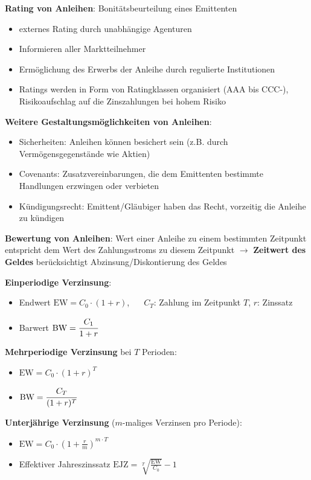 \textbf{Rating von Anleihen}: Bonitätsbeurteilung eines Emittenten
\begin{itemize}
	\item externes Rating durch unabhängige Agenturen
	\item Informieren aller Marktteilnehmer
	\item Ermöglichung des Erwerbs der Anleihe durch regulierte Institutionen
	\item Ratings werden in Form von Ratingklassen organisiert (AAA bis CCC-), Risikoaufschlag auf die
	Zinszahlungen bei hohem Risiko
\end{itemize}
\bigskip
\textbf{Weitere Gestaltungsmöglichkeiten von Anleihen}:
\begin{itemize}
	\item Sicherheiten: Anleihen können besichert sein (z.B. durch Vermögensgegenstände wie Aktien)
	\item Covenants: Zusatzvereinbarungen, die dem Emittenten bestimmte Handlungen erzwingen oder verbieten
	\item Kündigungsrecht: Emittent/Gläubiger haben das Recht, vorzeitig die Anleihe zu kündigen
\end{itemize}
\bigskip
\textbf{Bewertung von Anleihen}: Wert einer Anleihe zu einem bestimmten Zeitpunkt entspricht dem Wert des Zahlungsstroms zu diesem Zeitpunkt $\rightarrow$ \textbf{Zeitwert des Geldes} berücksichtigt Abzinsung/Diskontierung des Geldes

\textbf{Einperiodige Verzinsung}:
\begin{itemize}
	\item Endwert $\text{EW}=C_0\cdot (1+r)$, $\;\;\;\;\; C_T$: Zahlung im Zeitpunkt $T$, $r$: Zinssatz
	\item Barwert $\text{BW}=\cfrac{C_1}{1+r}$
\end{itemize}

\textbf{Mehrperiodige Verzinsung} bei $T$ Perioden:
\begin{itemize}
	\item $\text{EW}=C_0\cdot (1+r)^T$
	\item $\text{BW}=\cfrac{C_T}{(1+r)^T}$
\end{itemize}

\textbf{Unterjährige Verzinsung} ($m$-maliges Verzinsen pro Periode):
\begin{itemize}
	\item $\text{EW}=C_0\cdot (1+\frac{r}{m})^{m\cdot T}$
	\item Effektiver Jahreszinssatz $\text{EJZ}=\sqrt[T]{\frac{\text{EW}}{C_0}}-1$
\end{itemize}

